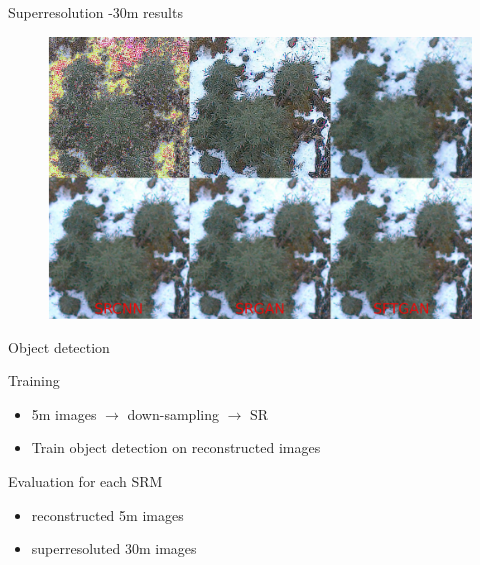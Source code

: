 \documentclass[aspectratio=43]{beamer}
\begin{document}
\begin{frame}{Superresolution -30m results}
	\centering
	\bigskip\bigskip
	\begin{figure}	
		\includegraphics[width=\textwidth]{img/sr-result-30m.png}
	\end{figure}
\end{frame}



\begin{frame}{Object detection}
	\begin{block}{Training}
	\begin{itemize}
		\item 5m images $\rightarrow$ down-sampling $\rightarrow$ SR 
		\item Train object detection on reconstructed images
	\end{itemize}
	\end{block}
	
	\begin{block}{Evaluation for each SRM}
	\begin{itemize}
		\item reconstructed 5m images
		\item superresoluted 30m images
	\end{itemize}
	
	\end{block}
	
\end{frame}
\end{document}
